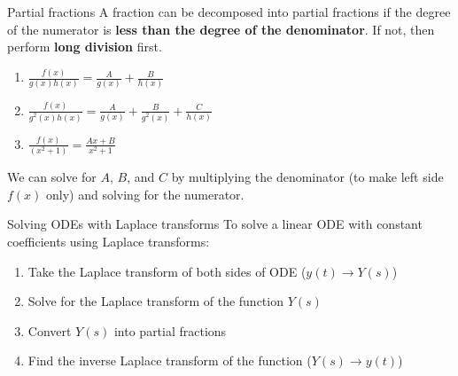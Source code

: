 \begin{knBox}
    {Partial fractions}
    A fraction can be decomposed into partial fractions if the degree of the numerator is \textbf{less than the degree of the denominator}. If not, then perform \textbf{long division} first.
    \begin{enumerate}
        \item $\frac{f(x)}{g(x)h(x)} = \frac{A}{g(x)} + \frac{B}{h(x)}$
        \item $\frac{f(x)}{g^2(x)h(x)} = \frac{A}{g(x)} + \frac{B}{g^2(x)} + \frac{C}{h(x)}$
        \item $\frac{f(x)}{(x^2+1)} = \frac{Ax+B}{x^2+1}$
    \end{enumerate}
    We can solve for $A$, $B$, and $C$ by multiplying the denominator (to make left side $f(x)$ only) and solving for the numerator.
\end{knBox}

\begin{definition}
    {Solving ODEs with Laplace transforms}
    To solve a linear ODE with constant coefficients using Laplace transforms:
    \begin{enumerate}
        \item Take the Laplace transform of both sides of ODE ($y(t) \to Y(s)$)
        \item Solve for the Laplace transform of the function $Y(s)$
        \item Convert $Y(s)$ into partial fractions
        \item Find the inverse Laplace transform of the function ($Y(s)\to y(t)$)
    \end{enumerate}
\end{definition}